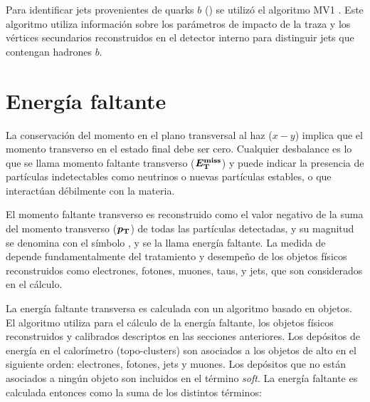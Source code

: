 
Para identificar jets provenientes de quarks $b$ (\bjets) se utilizó el
algoritmo MV1 \cite{ATLAS-CONF-2014-046,btagging}.
Este algoritmo utiliza
información sobre los parámetros de impacto de la traza y los vértices
secundarios reconstruidos en el detector interno para distinguir jets que
contengan hadrones $b$.



\section{Energía faltante}
\label{sec:met_obj}

La conservación del momento en el plano transversal al haz ($x-y$) implica que
el momento transverso en el estado final debe ser cero. Cualquier desbalance es
lo que se llama momento faltante transverso ($\bm{E_{\mathrm{T}}^{\mathrm{miss}}}$) y puede indicar la
presencia de partículas indetectables como neutrinos o nuevas partículas
estables, o que interactúan débilmente con la materia.

El momento faltante transverso es reconstruido como el valor negativo de la suma del
momento transverso ($\bm{p_{\mathrm{T}}}$) de todas las partículas detectadas, y su magnitud se
denomina con el símbolo {\met}, y se la llama energía faltante. La medida de
{\met} depende fundamentalmente del tratamiento y desempeño de los objetos
físicos reconstruidos como electrones, fotones, muones, taus, y jets, que son
considerados en el cálculo.

La energía faltante transversa es calculada con un algoritmo basado en objetos\cite{Khoo:2012749}.
El algoritmo utiliza para el cálculo de la energía faltante, los objetos físicos
reconstruidos y calibrados descriptos en las secciones anteriores. Los depósitos
de energía en el calorímetro (topo-clusters) son asociados a los objetos de alto
{\pt} en el siguiente orden: electrones, fotones, jets y muones. Los depósitos
que no están asociados a ningún objeto son incluidos en el término \emph{soft}.
La energía faltante es calculada entonces como la suma de los distintos
términos:

